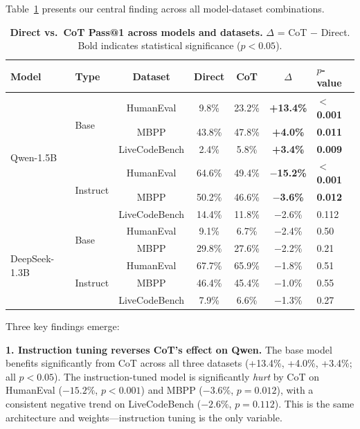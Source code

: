 \documentclass{article}
\begin{document}
Table~\ref{tab:generation} presents our central finding across all model-dataset combinations.

\begin{table}[h]
    \centering
    \caption{\textbf{Direct vs.\ CoT Pass@1 across models and datasets.} $\Delta$ = CoT $-$ Direct. Bold indicates statistical significance ($p < 0.05$).}
    \label{tab:generation}
    \begin{tabular}{llccccl}
        \toprule
        \textbf{Model} & \textbf{Type} & \textbf{Dataset} & \textbf{Direct} & \textbf{CoT} & \textbf{$\Delta$} & \textbf{$p$-value} \\
        \midrule
        \multirow{6}{*}{Qwen-1.5B}
        & \multirow{3}{*}{Base} & HumanEval & 9.8\% & 23.2\% & \textbf{+13.4\%} & \textbf{$<$0.001} \\
        & & MBPP & 43.8\% & 47.8\% & \textbf{+4.0\%} & \textbf{0.011} \\
        & & LiveCodeBench & 2.4\% & 5.8\% & \textbf{+3.4\%} & \textbf{0.009} \\
        \cmidrule{2-7}
        & \multirow{3}{*}{Instruct} & HumanEval & 64.6\% & 49.4\% & \textbf{$-$15.2\%} & \textbf{$<$0.001} \\
        & & MBPP & 50.2\% & 46.6\% & \textbf{$-$3.6\%} & \textbf{0.012} \\
        & & LiveCodeBench & 14.4\% & 11.8\% & $-$2.6\% & 0.112 \\
        \midrule
        \multirow{5}{*}{DeepSeek-1.3B}
        & \multirow{2}{*}{Base} & HumanEval & 9.1\% & 6.7\% & $-$2.4\% & 0.50 \\
        & & MBPP & 29.8\% & 27.6\% & $-$2.2\% & 0.21 \\
        \cmidrule{2-7}
        & \multirow{3}{*}{Instruct} & HumanEval & 67.7\% & 65.9\% & $-$1.8\% & 0.51 \\
        & & MBPP & 46.4\% & 45.4\% & $-$1.0\% & 0.55 \\
        & & LiveCodeBench & 7.9\% & 6.6\% & $-$1.3\% & 0.27 \\
        \bottomrule
    \end{tabular}
\end{table}

Three key findings emerge:

\textbf{1. Instruction tuning reverses CoT's effect on Qwen.} The base model benefits significantly from CoT across all three datasets (+13.4\%, +4.0\%, +3.4\%; all $p < 0.05$). The instruction-tuned model is significantly \emph{hurt} by CoT on HumanEval ($-15.2\%$, $p < 0.001$) and MBPP ($-3.6\%$, $p = 0.012$), with a consistent negative trend on LiveCodeBench ($-2.6\%$, $p = 0.112$). This is the same architecture and weights---instruction tuning is the only variable.
\end{document}
